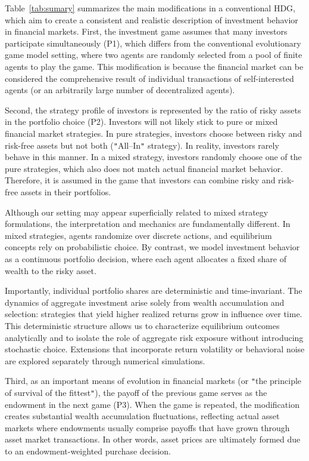 \documentclass[11pt,a4paper]{article}
\begin{document}
Table~\ref{tab:sumary} summarizes the main modifications in a conventional HDG, which aim to create a consistent and realistic description of investment behavior in financial markets. First, the investment game assumes that many investors participate simultaneously (P1), which differs from the conventional evolutionary game model setting, where two agents are randomly selected from a pool of finite agents to play the game. This modification is because the financial market can be considered the comprehensive result of individual transactions of self-interested agents (or an arbitrarily large number of decentralized agents).

Second, the strategy profile of investors is represented by the ratio of risky assets in the portfolio choice (P2). Investors will not likely stick to pure or mixed financial market strategies. In pure strategies, investors choose between risky and risk-free assets but not both (\texttt{"}All--In\texttt{"} strategy). In reality, investors rarely behave in this manner. In a mixed strategy, investors randomly choose one of the pure strategies, which also does not match actual financial market behavior. Therefore, it is assumed in the game that investors can combine risky and risk-free assets in their portfolios. 


Although our setting may appear superficially related to mixed strategy formulations, the interpretation and mechanics are fundamentally different. In mixed strategies, agents randomize over discrete actions, and equilibrium concepts rely on probabilistic choice. By contrast, we model investment behavior as a continuous portfolio decision, where each agent allocates a fixed share of wealth to the risky asset. 

Importantly, individual portfolio shares are deterministic and time-invariant. The dynamics of aggregate investment arise solely from wealth accumulation and selection: strategies that yield higher realized returns grow in influence over time. This deterministic structure allows us to characterize equilibrium outcomes analytically and to isolate the role of aggregate risk exposure without introducing stochastic choice. Extensions that incorporate return volatility or behavioral noise are explored separately through numerical simulations.


Third, as an important means of evolution in financial markets (or \texttt{"}the principle of survival of the fittest\texttt{"}), the payoff of the previous game serves as the endowment in the next game (P3). When the game is repeated, the modification creates substantial wealth accumulation fluctuations, reflecting actual asset markets where endowments usually comprise payoffs that have grown through asset market transactions. In other words, asset prices are ultimately formed due to an endowment-weighted purchase decision.
\end{document}
